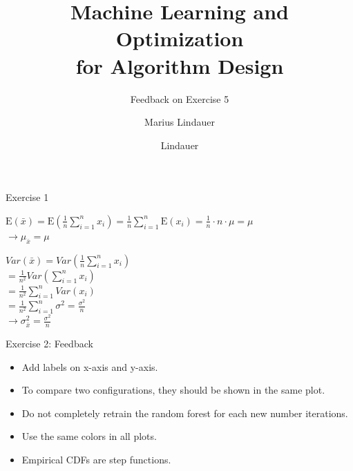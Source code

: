 \documentclass[t]{beamer}
\title[MLOAD]{Machine Learning and Optimization\\ for Algorithm Design}
\subtitle{Feedback on Exercise 5}
\author{Marius Lindauer}
\institute{University of Freiburg}
\date{}
\begin{document}
{
}
\author{Lindauer}
\institute{}
\logo{}

\begin{frame}[c,fragile]{Exercise 1}

\centering
$\mathrm{E}(\bar{x}) =  \mathrm{E}(\frac{1}{n} \sum_{i=1}^n x_i) = \frac{1}{n} \sum_{i=1}^n \mathrm{E}(x_i) = \frac{1}{n} \cdot n \cdot \mu = \mu$\\
\medskip
$\to \mu_{\bar{x}} = \mu$

\bigskip
\vspace{2em}
\pause

$Var(\bar{x}) = Var(\frac{1}{n} \sum_{i=1}^{n} x_i)$\\[1em]
 
$= \frac{1}{n^2} Var(\sum_{i=1}^{n} x_i)$\\[1em]

$= \frac{1}{n^2} \sum_{i=1}^{n} Var(x_i)$\\[1em]
 
$= \frac{1}{n^2} \sum_{i=1}^{n} \sigma^2 = \frac{\sigma^2}{n}$\\[1em]

$\to \sigma^2_{\bar{x}} = \frac{\sigma^2}{n}$

\end{frame}
\begin{frame}[c,fragile]{Exercise 2: Feedback}

\begin{itemize}
  \item Add labels on x-axis and y-axis.
  \medskip
  \item To compare two configurations, they should be shown in the same plot.
  \medskip
  \item Do not completely retrain the random forest for each new number iterations.
  \medskip
  \item Use the same colors in all plots.
  \medskip
  \item Empirical CDFs are step functions.
\end{itemize}

\end{frame}
\end{document}

